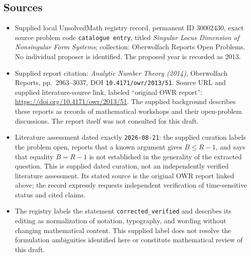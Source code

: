\documentclass[11pt]{article}
\begin{document}
\subsection{Sources}
\begin{itemize}
\item Supplied local UnsolvedMath registry record, permanent ID \(30002430\), exact source problem code \texttt{catalogue entry}, titled \emph{Singular Locus Dimension of Nonsingular Form Systems}; collection: Oberwolfach Reports Open Problems. No individual proposer is identified. The proposed year is recorded as 2013.
\item Supplied report citation: \emph{Analytic Number Theory (2014)}, Oberwolfach Reports, pp.~2963--3037, DOI \texttt{10.4171/owr/2013/51}. Source URL and supplied literature-source link, labeled ``original OWR report'': \url{https://doi.org/10.4171/owr/2013/51}. The supplied background describes these reports as records of mathematical workshops and their open-problem discussions. The report itself was not consulted for this draft.
\item Literature assessment dated exactly \texttt{2026-08-21}: the supplied curation labels the problem open, reports that a known argument gives \(B\leq R-1\), and says that equality \(B=R-1\) is not established in the generality of the extracted question. This is supplied dated curation, not an independently verified literature assessment. Its stated source is the original OWR report linked above; the record expressly requests independent verification of time-sensitive status and cited claims.
\item The registry labels the statement \texttt{corrected\_verified} and describes its editing as normalization of notation, typography, and wording without changing mathematical content. This supplied label does not resolve the formulation ambiguities identified here or constitute mathematical review of this draft.
\end{itemize}
\end{document}
